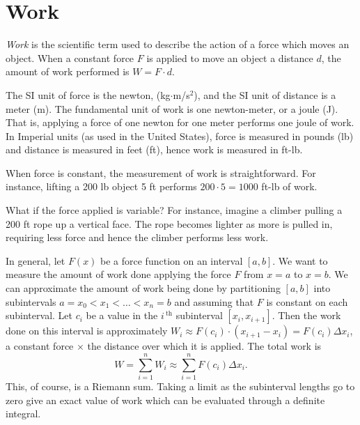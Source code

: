 \section{Work}\label{sec:work}

\emph{Work} is the scientific term used to describe the action of a force which moves an object. When a constant force $F$ is applied to move an object a distance $d$, the amount of work performed is $W=F\cdot d$. 

The SI unit of force is the newton, (kg$\cdot$m/s$^2$), and the SI unit of distance is a meter (m). The fundamental unit of work is one newton-meter, or a joule (J). That is, applying a force of one newton for one meter performs one joule of work. In Imperial units (as used in the United States), force is measured in pounds (lb) and distance is measured in feet (ft), hence work is measured in ft-lb. 


When force is constant, the measurement of work is straightforward. For instance, lifting a 200 lb object 5 ft performs $200\cdot 5 = 1000$ ft-lb of work. 

What if the force applied is variable? For instance, imagine a climber pulling a 200 ft rope up a vertical face. The rope becomes lighter as more is pulled in, requiring less force and hence the climber performs less work.

In general, let $F(x)$ be a force function on an interval $[a,b]$. We want to measure the amount of work done applying the force $F$ from $x=a$ to $x=b$. We can approximate the amount of work being done by partitioning $[a,b]$ into subintervals $a=x_0<x_1 <\dots <x_n=b$ and assuming that $F$ is constant on each subinterval. Let $c_i$ be a value in the $i\,^{\text{th}}$ subinterval $[x_i,x_{i+1}]$. Then the work done on this interval is approximately $W_i\approx F(c_i)\cdot(x_{i+1}-x_i) = F(c_i)\Delta x_i$, a constant force $\times$ the distance over which it is applied. The total work is 
\[ W = \sum_{i=1}^n W_i \approx \sum_{i=1}^n F(c_i)\Delta x_i.\]
This, of course, is a Riemann sum. Taking a limit as the subinterval lengths go to zero give an exact value of work which can be evaluated through a definite integral.

